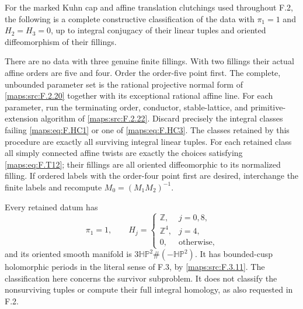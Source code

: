 \begin{corollary}\label{maps:src:F.2.30}


For the marked Kuhn cap and affine translation clutchings
used throughout F.2, the following is a complete constructive
classification of the data with
$\pi_1=1$ and $H_2=H_3=0$, up to integral conjugacy of their
linear tuples and oriented diffeomorphism of their fillings.

There are no data with three genuine finite fillings.
With two fillings their actual affine orders are five and
four.  Order the order-five point first.
The complete, unbounded parameter set is the rational
projective normal form of \ref{maps:src:F.2.20} together with its
exceptional rational affine line.
For each parameter, run the terminating order,
conductor, stable-lattice, and primitive-extension algorithm
of \ref{maps:src:F.2.22}.  Discard precisely the integral classes failing
\eqref{maps:eq:F.HC1} or one of \eqref{maps:eq:F.HC3}.
The classes retained by this procedure are exactly all
surviving integral linear tuples.
For each retained class all simply connected affine
twists are exactly the choices satisfying \eqref{maps:eq:F.T12};
their fillings are all oriented diffeomorphic to its
normalized filling.
If ordered labels with the order-four point first are
desired, interchange the finite labels and recompute
$M_0=(M_1M_2)^{-1}$.

Every retained datum has
\[
 \pi_1=1,\qquad
 H_j=\begin{cases}
  \mathbb Z,&j=0,8,\\
  \mathbb Z^4,&j=4,\\
  0,&\text{otherwise},
 \end{cases}
 \tag{F.HC13}\label{maps:eq:F.HC13}
\]
and its oriented smooth manifold is
$3\mathbb{HP}^2\#(-\mathbb{HP}^2)$.
It has bounded-cusp holomorphic periods in the literal
sense of F.3, by \ref{maps:src:F.3.11}.
The classification here concerns the survivor subproblem.
It does not classify the nonsurviving tuples or compute
their full integral homology, as also requested in F.2.

\end{corollary}



